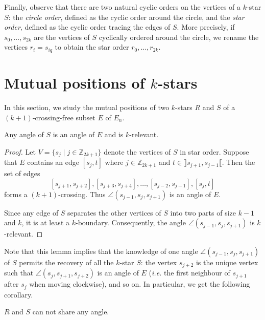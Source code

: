 \documentclass[12pt]{amsart}
\begin{document}
Finally, observe that there are two natural cyclic orders on the vertices of a $k$-star $S$: the \emph{circle order}, defined as the cyclic order around the circle, and the \emph{star order}, defined as the cyclic order tracing the edges of $S$. More precisely, if $s_0,\ldots,s_{2k}$ are the vertices of $S$ cyclically ordered around the circle, we rename the vertices $r_i=s_{iq}$ to obtain the star order $r_0,\ldots,r_{2k}$.




\section{Mutual positions of $k$-stars}\label{sectionstars}

In this section, we study the mutual positions of two $k$-stars $R$ and $S$ of a $(k+1)$-crossing-free subset $E$ of $E_n$.

\begin{lemma}\label{starangles}
Any angle of $S$ is an angle of $E$ and is $k$-relevant.
\end{lemma}

\begin{proof}
Let $V=\{s_j\;|\; j\in\mathbb{Z}_{2k+1}\}$ denote the vertices of $S$ in star order.
Suppose that $E$ contains an edge $[s_j,t]$ where $j\in\mathbb{Z}_{2k+1}$ and $t\in\rrbracket s_{j+1},s_{j-1}\llbracket$. Then the set of edges $$[s_{j+1},s_{j+2}],[s_{j+3},s_{j+4}],\ldots,[s_{j-2},s_{j-1}],[s_j,t]$$ forms a $(k+1)$-crossing. Thus $\angle(s_{j-1},s_j,s_{j+1})$ is an angle of $E$.

Since any edge of $S$ separates the other vertices of $S$ into two parts of size $k-1$ and $k$, it is at least a $k$-boundary. Consequently, the angle $\angle(s_{j-1},s_j,s_{j+1})$ is $k$-relevant.
\end{proof}

Note that this lemma implies that the knowledge of one angle $\angle(s_{j-1},s_j,s_{j+1})$ of $S$ permits the recovery of all the $k$-star $S$: the vertex $s_{j+2}$ is the unique vertex such that $\angle(s_j,s_{j+1},s_{j+2})$ is an angle of $E$ ({\it i.e.} the first neighbour of $s_{j+1}$ after $s_j$ when moving clockwise), and so on.
In particular, we get the following corollary.

\begin{corollary}
$R$ and $S$ can not share any angle.
\end{corollary}
\end{document}
